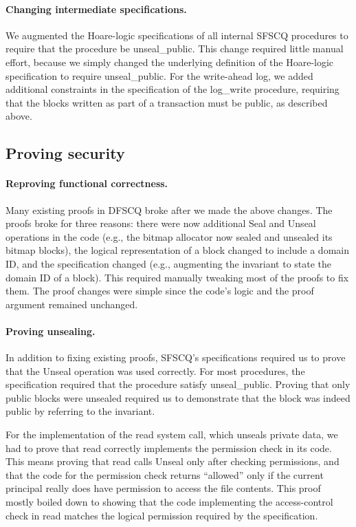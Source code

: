 \paragraph{Changing intermediate specifications.}

We augmented the Hoare-logic specifications of all internal SFSCQ
procedures to require that the procedure be {unseal\_public}.
This change required little manual effort, because we simply changed
the underlying definition of the Hoare-logic specification to require
{unseal\_public}.  For the write-ahead log, we added additional
constraints in the specification of the {log\_write} procedure,
requiring that the blocks written as part of a transaction must be public,
as described above.


\subsection{Proving security}


\paragraph{Reproving functional correctness.}

Many existing proofs in DFSCQ broke after we made the above changes.  The proofs
broke for three reasons: there were now additional {Seal} and {Unseal}
operations in the code (e.g., the bitmap allocator now sealed and unsealed its
bitmap blocks), the logical representation of a block changed to include a
domain ID, and the specification changed (e.g., augmenting the invariant to
state the domain ID of a block).  This required manually tweaking most of the
proofs to fix them.  The proof changes were simple since the code's logic and
the proof argument remained unchanged.


\paragraph{Proving unsealing.}

In addition to fixing existing proofs, SFSCQ's specifications required us to prove that
the {Unseal} operation was used correctly.  For most procedures, the
specification required that the procedure satisfy {unseal\_public}.
Proving that only public blocks were unsealed required us to demonstrate
that the block was indeed public by referring to the invariant.

For the implementation of the {read} system call, which unseals private
data, we had to prove that {read} correctly implements the permission
check in its code.  This means proving that {read} calls {Unseal}
only after checking permissions, and that the code for the permission
check returns ``allowed'' only if the current principal really does have
permission to access the file contents.  This proof mostly boiled down to
showing that the code implementing the access-control check in {read}
matches the logical permission required by the specification.


